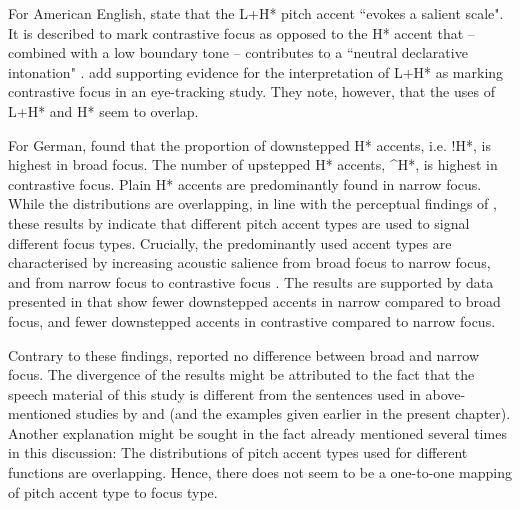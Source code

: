 For American English, \citet[296]{PierrehumbertHirschberg1990} state that the L+H* pitch accent ``evokes a salient scale". It is described to mark contrastive focus as opposed to the H* accent that -- combined with a low boundary tone -- contributes to a ``neutral declarative intonation" \citep[290]{PierrehumbertHirschberg1990}. \citet{WatsonTanenhausGunlogson2008} add supporting evidence for the interpretation of L+H* as marking contrastive focus in an eye-tracking study. They note, however, that the uses of L+H* and H* seem to overlap.

For German, \citet{Baumannetal2007} found that the proportion of downstepped H* accents, i.e. !H*, is highest in broad focus. The number of upstepped H* accents, \^{}H*, is highest in contrastive focus. Plain H* accents are predominantly found in narrow focus. While the distributions are overlapping, in line with the perceptual findings of \citet{WatsonTanenhausGunlogson2008}, these results by \citet{Baumannetal2007} indicate that different pitch accent types are used to signal different focus types. Crucially, the predominantly used accent types are characterised by increasing acoustic salience from broad focus to narrow focus, and from narrow focus to contrastive focus \citep[see][]{BaumannRöhr2015}. The results are supported by data presented in \citet{BaumannGriceSteindamm2006} that show fewer downstepped accents in narrow compared to broad focus, and fewer downstepped accents in contrastive compared to narrow focus. 

Contrary to these findings, \citet[63]{Fery1993} reported no difference between broad and narrow focus. The divergence of the results might be attributed to the fact that the speech material of this study is different from the sentences used in above-mentioned studies by \citet{Baumannetal2007} and \citet{BaumannGriceSteindamm2006} (and the examples given earlier in the present chapter). Another explanation might be sought in the fact already mentioned several times in this discussion: The distributions of pitch accent types used for different functions are overlapping. Hence, there does not seem to be a one-to-one mapping of pitch accent type to focus type.


